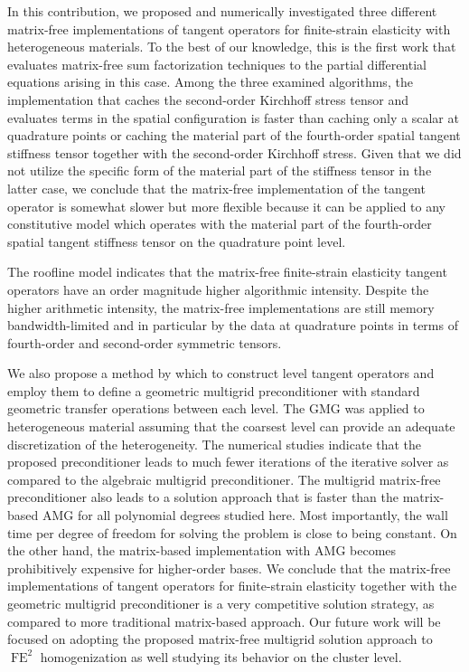 \documentclass[AMA,STIX1COL]{WileyNJD-v2}
\begin{document}
In this contribution, we proposed and numerically investigated three different matrix-free implementations of tangent operators for finite-strain elasticity with heterogeneous materials.
To the best of our knowledge, this is the first work that evaluates matrix-free sum factorization techniques to the partial differential equations arising in this case.
Among the three examined algorithms,
the implementation that caches the second-order Kirchhoff stress tensor and evaluates terms in the spatial configuration is faster than caching only a scalar at quadrature points or caching the material part of the fourth-order spatial tangent stiffness tensor together with the second-order Kirchhoff stress.
{\color{red}
Given that we did not utilize the specific form of the material part of the stiffness tensor in the latter case, we conclude
that the matrix-free implementation of the tangent operator is somewhat slower but more flexible because it can be applied to any constitutive model which operates with the material part of the fourth-order spatial tangent stiffness tensor on the quadrature point level.
}

The roofline model indicates that the matrix-free finite-strain elasticity tangent operators have an order magnitude higher algorithmic intensity.
{\color{red}
Despite the higher arithmetic intensity, the matrix-free implementations are still memory bandwidth-limited and in particular by the data at quadrature points in terms of fourth-order and second-order symmetric tensors.
}

We also propose a method by which to construct level tangent operators and employ them to define a geometric multigrid preconditioner
with standard geometric transfer operations between each level.
The GMG was applied to heterogeneous material assuming that the coarsest level can provide an adequate discretization of the heterogeneity.
The numerical studies indicate that the proposed preconditioner
leads to much fewer iterations of the iterative solver as compared to the algebraic multigrid preconditioner.
The multigrid matrix-free preconditioner also
leads to a solution approach that is faster than the matrix-based AMG for all polynomial degrees studied here.
Most importantly, the wall time per degree of freedom for solving the problem is close to being constant.
On the other hand, the matrix-based implementation with AMG becomes prohibitively expensive for higher-order bases.
We conclude that the matrix-free implementations of tangent operators for finite-strain elasticity together with
the geometric multigrid preconditioner is a very competitive solution strategy, as compared to more traditional matrix-based approach.
Our future work will be focused on adopting the proposed matrix-free multigrid solution approach to $\operatorname{FE}^2$ homogenization
as well studying its behavior on the cluster level.
\end{document}
